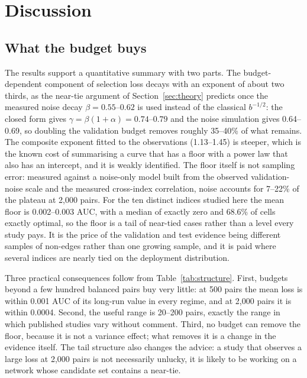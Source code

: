 \documentclass{comjnl}
\begin{document}
\section{Discussion}
\label{sec:discussion}

\subsection{What the budget buys}

The results support a quantitative summary with two parts. The budget-dependent component of selection loss decays with an exponent of about two thirds, as the near-tie argument of Section~\ref{sec:theory} predicts once the measured noise decay $\beta=0.55$--$0.62$ is used instead of the classical $b^{-1/2}$: the closed form gives $\gamma=\beta(1+\alpha)=0.74$--$0.79$ and the noise simulation gives 0.64--0.69, so doubling the validation budget removes roughly 35--40\% of what remains. The composite exponent fitted to the observations (1.13--1.45) is steeper, which is the known cost of summarising a curve that has a floor with a power law that also has an intercept, and it is weakly identified. The floor itself is not sampling error: measured against a noise-only model built from the observed validation-noise scale and the measured cross-index correlation, noise accounts for 7--22\% of the plateau at 2{,}000 pairs. For the ten distinct indices studied here the mean floor is 0.002--0.003 AUC, with a median of exactly zero and 68.6\% of cells exactly optimal, so the floor is a tail of near-tied cases rather than a level every study pays. It is the price of the validation and test evidence being different samples of non-edges rather than one growing sample, and it is paid where several indices are nearly tied on the deployment distribution.

Three practical consequences follow from Table~\ref{tab:structure}. First, budgets beyond a few hundred balanced pairs buy very little: at 500 pairs the mean loss is within 0.001 AUC of its long-run value in every regime, and at 2{,}000 pairs it is within 0.0004. Second, the useful range is 20--200 pairs, exactly the range in which published studies vary without comment. Third, no budget can remove the floor, because it is not a variance effect; what removes it is a change in the evidence itself. The tail structure also changes the advice: a study that observes a large loss at 2{,}000 pairs is not necessarily unlucky, it is likely to be working on a network whose candidate set contains a near-tie.
\end{document}
